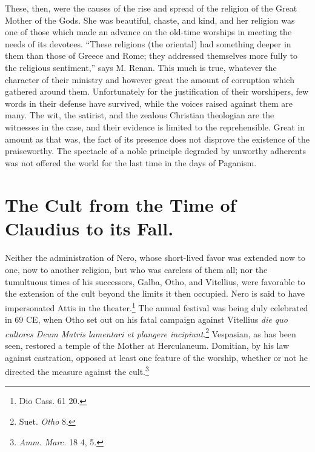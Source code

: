 \documentclass[a4paper, 11pt, oneside, polutonikogreek, french]{article}
\begin{document}
These, then, were the causes of the rise and spread of the religion of the Great Mother of the Gods. She was beautiful, chaste, and kind, and her religion was one of those which made an advance on the old-time worships in meeting the needs of its devotees. ``These religions (the oriental) had something deeper in them than those of Greece and Rome; they addressed themselves more fully to the religious sentiment,'' says M. Renan. This much is true, whatever the character of their ministry and however great the amount of corruption which gathered around them. Unfortunately for the justification of their worshipers, few words in their defense have survived, while the voices raised against them are many. The wit, the satirist, and the zealous Christian theologian are the witnesses in the case, and their evidence is limited to the reprehensible. Great in amount as that was, the fact of its presence does not disprove the existence of the praiseworthy. The spectacle of a noble principle degraded by unworthy adherents was not offered the world for the last time in the days of Paganism.
\clearpage
\section{The Cult from the Time of Claudius to its Fall.}
\paragraph{}
Neither the administration of Nero, whose short-lived favor was extended now to one, now to another religion, but who was careless of them all; nor the tumultuous times of his successors, Galba, Otho, and Vitellius, were favorable to the extension of the cult beyond the limits it then occupied. Nero is said to have impersonated Attis in the theater.\footnote{Dio Cass. 61 20.} The annual festival was being duly celebrated in 69 \textsc{CE}, when Otho set out on his fatal campaign against Vitellius \emph{die quo cultores Deum Matris lamentari et plangere incipiunt}.\footnote{Suet. \emph{Otho} 8.} Vespasian, as has been seen, restored a temple of the Mother at Herculaneum. Domitian, by his law against castration, opposed at least one feature of the worship, whether or not he directed the measure against the cult.\footnote{\emph{Amm. Marc.} 18 4, 5.}
\end{document}
